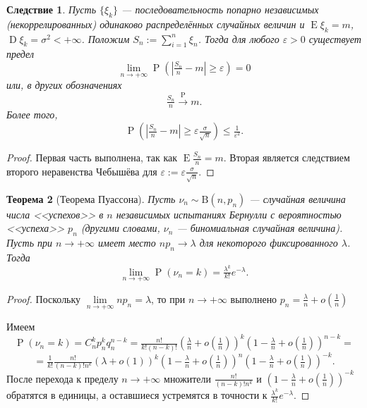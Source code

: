 \documentclass[12pt]{article}
\newtheorem{theorem}{Теорема}
\newtheorem{corollary}[theorem]{Следствие}
\numberwithin{theorem}{section}
\theoremstyle{definition}
\newcommand{\prob}{\operatorname{P}}
\newcommand{\expect}{\operatorname{E}}
\newcommand{\disp}{\operatorname{D}}
\begin{document}
	\begin{corollary}
		Пусть $ \{\xi_k\} $ --- последовательность попарно независимых (некоррелированных)
		одинаково распределённых случайных величин и $ \expect\xi_k = m $,
		$ \disp\xi_k = \sigma^2 < +\infty $. Положим $ S_n := \sum\limits_{i = 1}^{n} \xi_n $.
		Тогда для любого $ \varepsilon > 0 $ существует предел
		$$ \lim\limits_{n \to +\infty} \prob(|\tfrac{S_n}{n} - m| \geqslant \varepsilon) = 0 $$ 
		или, в других обозначениях 
		$$ \tfrac{S_n}{n} \overset{\prob}{\to} m. $$
		Более того,
		$$ \prob(|\tfrac{S_n}{n} - m| \geqslant \varepsilon\tfrac{\sigma}{\sqrt{n}}) \leqslant \tfrac{1}{\varepsilon^2}. $$
	\end{corollary}
	
	\begin{proof}
		Первая часть выполнена, так как $ \expect\tfrac{S_n}{n} = m $.
		Вторая является следствием второго неравенства Чебышёва
		для $ \varepsilon := \varepsilon\tfrac{\sigma}{\sqrt{n}} $.
	\end{proof}
	
	\begin{theorem}[Теорема Пуассона]
		Пусть $ \nu_n \sim \mathrm{B}(n, p_n) $ --- случайная величина числа <<успехов>> в $ n $ независимых испытаниях Бернулли
		с вероятностью <<успеха>> $ p_n $ (другими словами, $ \nu_n $ --- биномиальная случайная величина).
		Пусть при $ n \to +\infty $ имеет место $ np_n \to \lambda $ для некоторого фиксированного $ \lambda $.
		Тогда
		$$ \lim\limits_{n \to + \infty} \prob(\nu_n = k) = \tfrac{\lambda^k}{k!}e^{-\lambda}. $$
	\end{theorem}
	
	\begin{proof}
		Поскольку $ \lim\limits_{n \to +\infty} np_n = \lambda $,
		то при $ n \to +\infty $ выполнено $ p_n =  \tfrac{\lambda}{n} + o(\tfrac{1}{n}) $
		
		Имеем 
		$$ \prob(\nu_n = k) = C_{n}^kp_n^kq_n^{n - k} 
		= \tfrac{n!}{k!(n - k)!}\left(\tfrac{\lambda}{n} + o(\tfrac{1}{n})\right)^k
		\left(1 - \tfrac{\lambda}{n} + o(\tfrac{1}{n})\right)^{n - k} = $$
		$$ = \tfrac{1}{k!} \tfrac{n!}{(n - k)!n^{k}}\left(\lambda + o(1)\right)^k
		\left(1 - \tfrac{\lambda}{n} + o(\tfrac{1}{n})\right)^{n}\left(1 - \tfrac{\lambda}{n} + o(\tfrac{1}{n})\right)^{-k}. $$
		После перехода к пределу $ n \to +\infty $
		множители $ \tfrac{n!}{(n - k)!n^{k}} $ и $ \left(1 - \tfrac{\lambda}{n} + o(\tfrac{1}{n})\right)^{-k} $
		обратятся в единицы, а оставшиеся устремятся в точности к $ \tfrac{\lambda^k}{k!}e^{-\lambda} $.
	\end{proof}
	
\end{document}
